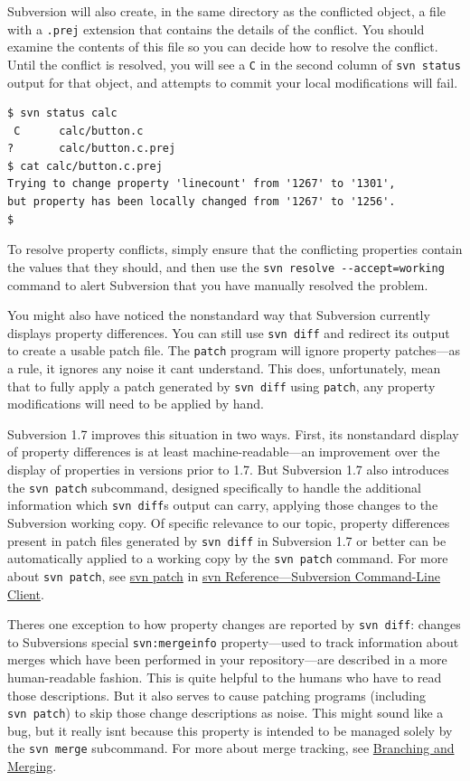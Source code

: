 Subversion will also create, in the same directory as the conflicted
object, a file with a \texttt{.prej} extension that contains the details
of the conflict. You should examine the contents of this file so you can
decide how to resolve the conflict. Until the conflict is resolved, you
will see a \texttt{C} in the second column of \texttt{svn\ status}
output for that object, and attempts to commit your local modifications
will fail.

\begin{verbatim}
$ svn status calc
 C      calc/button.c
?       calc/button.c.prej
$ cat calc/button.c.prej 
Trying to change property 'linecount' from '1267' to '1301',
but property has been locally changed from '1267' to '1256'.
$
\end{verbatim}

To resolve property conflicts, simply ensure that the conflicting
properties contain the values that they should, and then use the
\texttt{svn\ resolve\ -\/-accept=working} command to alert Subversion
that you have manually resolved the problem.

You might also have noticed the nonstandard way that Subversion
currently displays property differences. You can still use
\texttt{svn\ diff} and redirect its output to create a usable patch
file. The \texttt{patch} program will ignore property patches---as a
rule, it ignores any noise it can\textquotesingle t understand. This
does, unfortunately, mean that to fully apply a patch generated by
\texttt{svn\ diff} using \texttt{patch}, any property modifications will
need to be applied by hand.

Subversion 1.7 improves this situation in two ways. First, its
nonstandard display of property differences is at least
machine-readable---an improvement over the display of properties in
versions prior to 1.7. But Subversion 1.7 also introduces the
\texttt{svn\ patch} subcommand, designed specifically to handle the
additional information which \texttt{svn\ diff}\textquotesingle s output
can carry, applying those changes to the Subversion working copy. Of
specific relevance to our topic, property differences present in patch
files generated by \texttt{svn\ diff} in Subversion 1.7 or better can be
automatically applied to a working copy by the \texttt{svn\ patch}
command. For more about \texttt{svn\ patch}, see
\hyperref[svn.ref.svn.c.patch]{svn patch} in \hyperref[svn.ref.svn]{svn
Reference---Subversion Command-Line Client}.

There\textquotesingle s one exception to how property changes are
reported by \texttt{svn\ diff}: changes to Subversion\textquotesingle s
special \texttt{svn:mergeinfo} property---used to track information
about merges which have been performed in your repository---are
described in a more human-readable fashion. This is quite helpful to the
humans who have to read those descriptions. But it also serves to cause
patching programs (including \texttt{svn\ patch}) to skip those change
descriptions as noise. This might sound like a bug, but it really
isn\textquotesingle t because this property is intended to be managed
solely by the \texttt{svn\ merge} subcommand. For more about merge
tracking, see \hyperref[svn.branchmerge]{Branching and Merging}.

